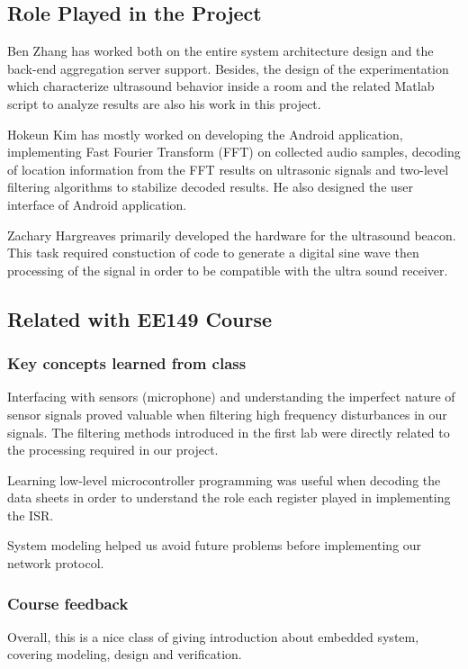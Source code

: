 \appendix

\subsection{Role Played in the Project}
\label{sec:role-played-project}
Ben Zhang has worked both on the entire system architecture design and the back-end aggregation server support. Besides, the design of the experimentation which characterize ultrasound behavior inside a room and the related Matlab script to analyze results are also his work in this project.

Hokeun Kim has mostly worked on developing the Android application, implementing Fast Fourier Transform (FFT) on collected audio samples, decoding of location information from the FFT results on ultrasonic signals and two-level filtering algorithms to stabilize decoded results. He also designed the user interface of Android application.

Zachary Hargreaves primarily developed the hardware for the ultrasound beacon.  This task required constuction of code to generate a digital sine wave then processing of the signal in order to be compatible with the ultra sound receiver.   

\subsection{Related with EE149 Course}
\label{sec:related-with-ee149}
\subsubsection{Key concepts learned from class}
\label{sec:key-concepts-learned}

Interfacing with sensors (microphone) and understanding the imperfect nature of sensor signals proved valuable when filtering high frequency disturbances in our signals. The filtering methods introduced in the first lab were directly related to the processing required in our project. 

Learning low-level microcontroller programming was useful when decoding the data sheets in order to understand the role each register played in implementing the ISR. 

System modeling helped us avoid future problems before implementing our network protocol.

\subsubsection{Course feedback}
\label{sec:course-feedback}
Overall, this is a nice class of giving introduction about embedded system, covering modeling, design and verification. 

